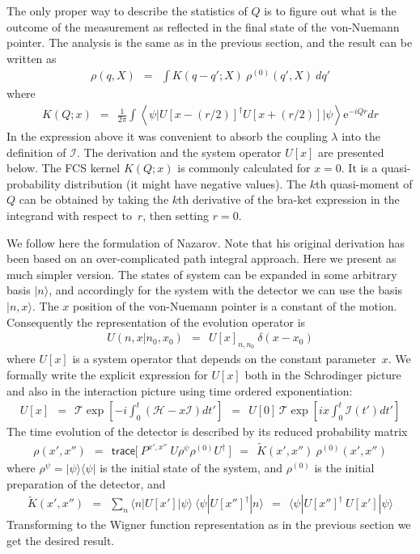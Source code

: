 \documentclass[onecolumn,fleqn]{revtex4}
\newcommand{\trc}{\mathsf{trace}}
\newcommand{\eexp}{\mathrm{e}^}
\newcommand{\beq}{\begin{eqnarray}}
\newcommand{\eeq}{\end{eqnarray}}
\begin{document}
The only proper way to describe the statistics of $Q$ 
is to figure out what is the outcome of the measurement 
as reflected in the final state of the von-Nuemann pointer.
The analysis is the same as in the previous section, 
and the result can be written as 
\beq
\rho(q,X) \ \ = \ \  \int K(q{-}q';X) \ \rho^{(0)}(q',X) \ dq' 
\eeq
where  
\beq
K(Q;x) \ \ = \ \ \frac{1}{2\pi} \int 
\left\langle \psi \Big| U[x-(r/2)]^{\dag} U[x+(r/2)] \Big| \psi \right\rangle \eexp{-iQr} dr
\eeq
In the expression above it was convenient 
to absorb the coupling $\lambda$ into the definition 
of $\mathcal{I}$. The derivation and the 
system operator $U[x]$ are presented below.   
The FCS kernel $K(Q;x)$ is commonly calculated for $x=0$. 
It is a quasi-probability distribution (it might have negative values).  
The $k$th quasi-moment of $Q$ can be obtained by taking the $k$th 
derivative of the bra-ket expression in the integrand 
with respect to~$r$, then setting $r=0$. 
 

We follow here the formulation of Nazarov. 
Note that his original derivation has been based on 
an over-complicated path integral approach.
Here we present as much simpler version. 
The states of system can be expanded in some arbitrary basis $|n\rangle$,  
and accordingly for the system with the detector 
we can use the basis ${|n,x\rangle}$. 
The $x$ position of the von-Nuemann pointer is 
a constant of the motion. Consequently the representation 
of the evolution operator is  
\beq
U(n,x|n_0,x_0) \ \ = \ \ U[x]_{n,n_0} \ \delta(x-x_0)
\eeq
where $U[x]$ is a system operator that depends 
on the constant parameter~$x$.    
We formally write the explicit expression for $U[x]$ both in the Schrodinger picture
and also in the interaction picture using time ordered exponentiation:  
\beq
U[x] 
\ \ = \ \ \mathcal{T}\exp\left[-i\int_0^t (\mathcal{H} - x\mathcal{I})dt' \right]   
\ \ = \ \ U[0] \,\mathcal{T}\exp\left[i x \int_0^t \mathcal{I}(t')dt' \right]  
\eeq
The time evolution of the detector is described by its 
reduced probability matrix 
\beq
\rho(x',x'') 
\ \ = \ \ \trc\Big[ \ P^{x',x''} \  U \rho^{\psi} \rho^{(0)} U^{\dag} \  \Big]
\ \ = \ \ \tilde{K}(x',x'') \ \rho^{(0)}(x',x'') 
\eeq
where ${\rho^{\psi} = |\psi\rangle\langle\psi|}$ is the 
initial state of the system, and ${\rho^{(0)}}$ 
is the initial preparation of the detector, and 
\beq
\tilde{K}(x',x'') 
\ \ = \ \ \sum_n \langle n | U[x'] | \psi \rangle \ \langle \psi | U[x'']^{\dag} | n \rangle
\ \ = \ \ \langle \psi | U[x'']^{\dag} \ U[x'] | \psi \rangle
\eeq
Transforming to the Wigner function representation as in the previous section 
we get the desired result.
\end{document}
